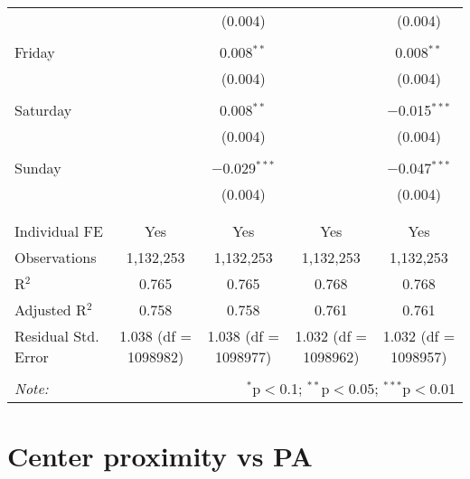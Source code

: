 \documentclass[
]{article}
\begin{document}
\begin{table}[!htbp]
{\begin{tabular}{@{\extracolsep{5pt}}lcccc}
  &  & (0.004) &  & (0.004) \\ 
  & & & & \\ 
 Friday &  & 0.008$^{**}$ &  & 0.008$^{**}$ \\ 
  &  & (0.004) &  & (0.004) \\ 
  & & & & \\ 
 Saturday &  & 0.008$^{**}$ &  & $-$0.015$^{***}$ \\ 
  &  & (0.004) &  & (0.004) \\ 
  & & & & \\ 
 Sunday &  & $-$0.029$^{***}$ &  & $-$0.047$^{***}$ \\ 
  &  & (0.004) &  & (0.004) \\ 
  & & & & \\ 
\hline \\[-1.8ex] 
Individual FE & Yes & Yes & Yes & Yes \\ 
Observations & 1,132,253 & 1,132,253 & 1,132,253 & 1,132,253 \\ 
R$^{2}$ & 0.765 & 0.765 & 0.768 & 0.768 \\ 
Adjusted R$^{2}$ & 0.758 & 0.758 & 0.761 & 0.761 \\ 
Residual Std. Error & 1.038 (df = 1098982) & 1.038 (df = 1098977) & 1.032 (df = 1098962) & 1.032 (df = 1098957) \\ 
\hline 
\hline \\[-1.8ex] 
\textit{Note:}  & \multicolumn{4}{r}{$^{*}$p$<$0.1; $^{**}$p$<$0.05; $^{***}$p$<$0.01} \\ 
\end{tabular}
} 
\end{table} 
\newpage
\section{Center proximity vs PA}
\end{document}
